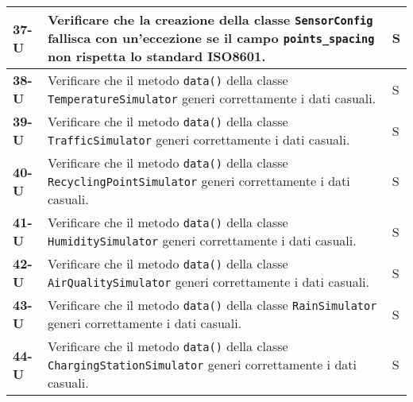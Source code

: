 \begin{longtable}{|>{\raggedright\arraybackslash}m{}|>{\raggedright\arraybackslash}m{}|>{\raggedright\arraybackslash}m{}|}
	\hline
	\textbf{37-U}   & Verificare che la creazione della classe \texttt{SensorConfig} fallisca con un'eccezione se il campo \texttt{points\_spacing} non rispetta lo standard ISO8601.                                                                                  & S              \\
	\hline
	\textbf{38-U}   & Verificare che il metodo \texttt{data()} della classe \texttt{TemperatureSimulator} generi correttamente i dati casuali.                                                                                                                         & S              \\
	\hline
	\textbf{39-U}   & Verificare che il metodo \texttt{data()} della classe \texttt{TrafficSimulator} generi correttamente i dati casuali.                                                                                                                             & S              \\
	\hline
	\textbf{40-U}   & Verificare che il metodo \texttt{data()} della classe \texttt{RecyclingPointSimulator} generi correttamente i dati casuali.                                                                                                                      & S              \\
	\hline
	\textbf{41-U}   & Verificare che il metodo \texttt{data()} della classe \texttt{HumiditySimulator} generi correttamente i dati casuali.                                                                                                                            & S              \\
	\hline
	\textbf{42-U}   & Verificare che il metodo \texttt{data()} della classe \texttt{AirQualitySimulator} generi correttamente i dati casuali.                                                                                                                          & S              \\
	\hline
	\textbf{43-U}   & Verificare che il metodo \texttt{data()} della classe \texttt{RainSimulator} generi correttamente i dati casuali.                                                                                                                                & S              \\
	\hline
	\textbf{44-U}   & Verificare che il metodo \texttt{data()} della classe \texttt{ChargingStationSimulator} generi correttamente i dati casuali.                                                                                                                     & S              \\

\end{longtable}
